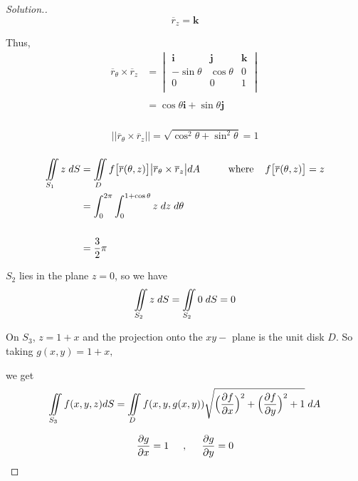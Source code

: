 \documentclass[11pt,a4paper]{article}
\theoremstyle{definition}
\newenvironment{solution}
  {\renewcommand{\qedsymbol}{}\begin{proof}[\textit{Solution}.]}
  {\end{proof}}
\begin{document}
\begin{solution}
$$\overline{r}_{z} = \textbf{k}$$

Thus,
\begin{align*}
\overline{r}_{\theta} \times \overline{r}_z & = \begin{vmatrix}
\textbf{i}  & \textbf{j} & \textbf{k}\\
-\sin \theta & \cos \theta & 0\\
0 & 0 & 1\\
\end{vmatrix}\\\\
& = \cos \theta \textbf{i} + \sin \theta \textbf{j}\\
\end{align*}

\begin{align*}
\big|\big|\overline{r}_{\theta} \times \overline{r}_z\big|\big| = \sqrt{\cos^2 \theta + \sin^2 \theta}= 1\\
\end{align*}

\begin{align*}
\iint\limits_{S_1}z\hspace{0.1cm}dS & = \iint\limits_D f\big[\overline{r}(\theta,z)\big]\big| \overline{r}_{\theta} \times \overline{r}_z\big| dA\hspace{1cm} \text{where}\hspace{0.4cm} f\big[\overline{r}(\theta,z)\big]=z\\
& = \int^{2\pi}_0 \int^{1 + \cos \theta}_0 z\hspace{0.1cm}dz\hspace{0.1cm} d\theta\\\\
& = \frac{3}{2}\pi\\
\end{align*}

$S_2$ lies in the plane $z = 0$, so we have $$\iint\limits_{S_2}z\hspace{0.1cm}dS = \iint\limits_{S_2}0\hspace{0.1cm}dS = 0$$

On $S_3$, $z = 1 + x$ and the projection onto the $xy-$ plane is the unit disk $D$. So taking $g(x,y) = 1 +x,$


we get
$$\iint\limits_{S_3} f(x,y,z) dS = \iint\limits_D f(x,y,g(x,y))\sqrt{\Big(\dfrac{\partial f}{\partial x}\Big)^2 + \Big(\dfrac{\partial f}{\partial y}\Big)^2 + 1}\hspace{0.1cm}dA$$

$$\frac{\partial g}{\partial x} = 1\hspace{0.5cm} , \hspace{0.5cm} \frac{\partial g}{\partial y}=0$$


\end{solution}
\end{document}
